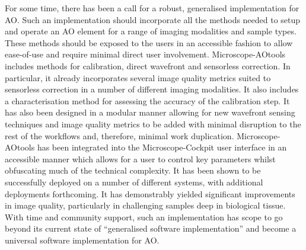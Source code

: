 For some time, there has been a call for a robust, generalised implementation 
for AO. Such an implementation should incorporate all the methods needed to
setup and operate an AO element for a range of imaging modalities and sample 
types. These methods should be exposed to the users in an accessible fashion 
to allow ease-of-use and require minimal direct user involvement. 
Microscope-AOtools includes methods for calibration, direct wavefront and 
sensorless correction. In particular, it already incorporates several image 
quality metrics suited to sensorless correction in a number of different 
imaging modalities. It also includes a characterisation method for assessing 
the accuracy of the calibration step. It has also been designed in a modular 
manner allowing for new wavefront sensing techniques and image quality 
metrics to be added with minimal disruption to the rest of the workflows and, 
therefore, minimal work duplication. Microscope-AOtools has been integrated 
into the Microscope-Cockpit user interface in an accessible manner which 
allows for a user to control key parameters whilst obfuscating much of the 
technical complexity. It has been shown to be successfully deployed on a 
number of different systems, with additional deployments forthcoming. It has 
demonstrably yielded significant improvements in image quality, particularly 
in challenging samples deep in biological tissue. With  time and community 
support, such an implementation has scope to go beyond its  current state of 
``generalised software implementation'' and become a universal software 
implementation for AO.
